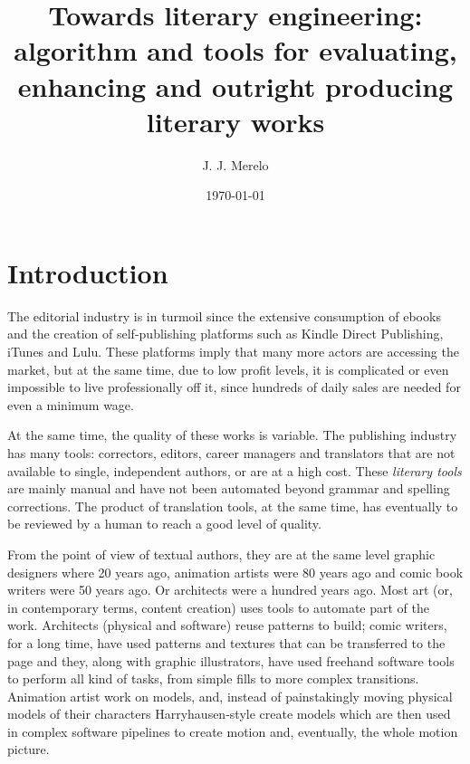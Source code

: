 \documentclass[a4paper,12pt,twocolumn]{article}
\title{Towards literary engineering: algorithm and tools for
  evaluating, enhancing and outright producing literary works}
\author{J. J. Merelo}
\date{\today}
\begin{document}
\section{Introduction}

The editorial industry is in turmoil since the extensive consumption
of ebooks and the creation of self-publishing platforms such as Kindle
Direct Publishing, iTunes and Lulu. These platforms imply that many more actors are accessing the market, but at the same time, due to low profit levels, it is complicated or even impossible to live professionally off it, since hundreds of daily sales are needed for even a minimum wage.

At the same time, the quality of these works is variable. The
publishing industry has many tools: correctors, editors, career
managers and translators that are not available to single, independent
authors, or are at a high cost. These {\em literary tools} are mainly manual and have not been
automated beyond grammar and spelling corrections. The product of translation tools,
at the same time, has eventually to be reviewed by a human to reach a
good level of quality.

From the point of view of textual authors, they are at the same level
graphic designers where 20 years ago, animation artists were 80 years ago and comic book writers were 50
years ago. Or architects were a hundred years ago. Most art (or, in
contemporary terms, content creation) uses tools to automate part of
the work. Architects (physical and software) reuse patterns to build;
comic writers, for a long time, have used patterns and textures that
can be transferred to the page and they, along with graphic
illustrators, have used freehand software tools to perform all kind of
tasks, from simple fills to more complex transitions. Animation artist
work on models, and, instead of painstakingly moving physical models
of their characters  Harryhausen-style create models which are then
used in complex software pipelines to create motion and, eventually,
the whole motion picture.
\end{document}

